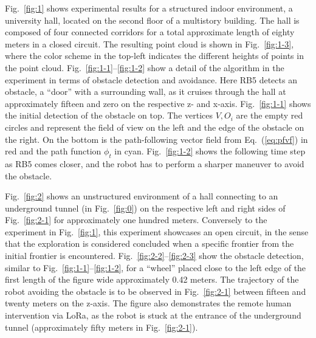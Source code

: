 \documentclass[letterpaper,10pt,conference,twoside]{IEEEtran}
\theoremstyle{definition}
\begin{document}

Fig.~\ref{fig:1} shows experimental results for a structured indoor environment, a university hall, located on the second floor of a multistory building. The hall is composed of four connected corridors for a total approximate length of eighty meters in a closed circuit. %
The resulting point cloud is shown in Fig.~\ref{fig:1-3}, where the color scheme in the top-left indicates the different heights of points in the point cloud. 
%
%
Fig.~\ref{fig:1-1}--\ref{fig:1-2} show a detail of the algorithm in the experiment in terms of obstacle detection and avoidance. Here RB5 detects an obstacle, a ``door'' with a surrounding wall, as it cruises through the hall at approximately fifteen and zero on the respective z- and x-axis. Fig.~\ref{fig:1-1} shows the initial detection of the obstacle on top. The vertices $V, O_i$ are the empty red circles and represent the field of view on the left and the edge of the obstacle on the right. On the bottom is the path-following vector field from Eq.~(\ref{eq:pfvf}) in red and the path function $\phi_t$ in cyan. Fig.~\ref{fig:1-2} shows the following time step as RB5 comes closer, and the robot has to perform a sharper maneuver to avoid the obstacle.

Fig.~\ref{fig:2} shows an unstructured environment of a hall connecting to an underground tunnel (in Fig.~\ref{fig:0}) on the respective left and right sides of Fig.~\ref{fig:2-1} for approximately one hundred meters. Conversely to the experiment in Fig.~\ref{fig:1}, this experiment showcases an open circuit, in the sense that the exploration is considered concluded when a specific frontier from the initial frontier is encountered. Fig.~\ref{fig:2-2}--\ref{fig:2-3} show the obstacle detection, similar to Fig.~\ref{fig:1-1}--\ref{fig:1-2}, for a ``wheel'' placed close to the left edge of the first length of the figure wide approximately 0.42 meters. The trajectory of the robot avoiding the obstacle is to be observed in Fig.~\ref{fig:2-1} between fifteen and twenty meters on the z-axis. The figure also demonstrates the remote human intervention via LoRa, as the robot is stuck at the entrance of the underground tunnel (approximately fifty meters in Fig.~\ref{fig:2-1}).
\end{document}
